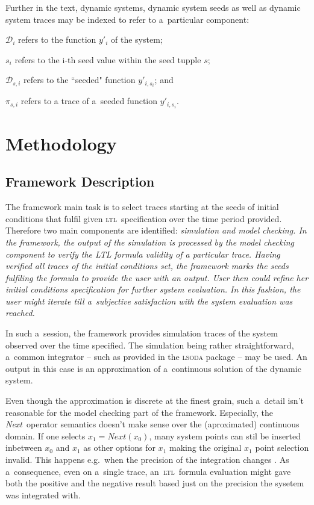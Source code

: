 \documentclass[12pt,oneside,draft]{fithesis}
\newcommand{\ltl}{\textsc{ltl}~}
\newcommand{\Next}{\emph{Next}~}
\newcommand{\mD}{\mathcal{D}}
\begin{document}
Further in the text, dynamic systems, dynamic system seeds as well as
dynamic system traces may be indexed to refer to a~particular component:
\begin{inparaenum}
	\item $\mD_i$ refers to the function $y'_i$ of the system;
	\item $s_i$ refers to the i-th seed value within the seed tupple
		$s$;
	\item $\mD_{s,i}$ refers to the ``seeded" function $y'_{i,s_i}$; and
	\item $\pi_{s,i}$ refers to a trace of a~seeded function
		$y'_{i,s_i}$.
\end{inparaenum}

\chapter{Methodology}
\section{Framework Description}
The framework main task is to select traces starting at the seeds of initial conditions
that fulfil given \ltl specification over the time period provided.
Therefore two main components are identified: \em simulation and model checking\rm{}.
In the framework, the output of the simulation is processed by the
model checking component to verify the LTL formula validity of a particular
trace. Having verified all traces of the initial conditions set, the framework
marks the seeds fulfiling the formula to provide the user with an output. 
User then could refine her initial conditions specification for further
system evaluation. In this fashion, the user might iterate till a~subjective satisfaction
with the system evaluation was reached.

In such a~session, the framework provides simulation traces of the system observed over
the time specified. The simulation being rather straightforward, a~common integrator -- such as provided in the \textsc{lsoda}
\cite{lsoda} package -- may be used.
An output in this case is an approximation of a~continuous solution of the dynamic system.

Even though the approximation is discrete at the finest grain, such a~detail isn't reasonable
for the model checking part of the framework. Especially, the \Next operator semantics doesn't make sense over the
(aproximated) continuous domain. If one selects $x_1 = Next(x_0)$, many system points can stil be inserted
inbetween $x_0$ and $x_1$ as other options for $x_1$ making the original $x_1$ point selection invalid.
This happens e.g.~when the precision of the integration changes \cite{integration}.
As a~consequence, even on a~single trace, an~\ltl formula evaluation might gave both the positive and the negative result
based just on the precision the sysetem was integrated with. 
\end{document}
